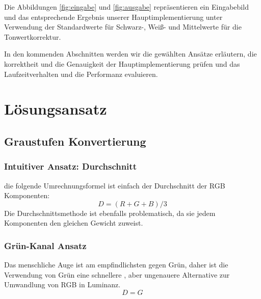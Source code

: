 \documentclass[course=erap]{aspdoc}
\begin{document}
Die Abbildungen \ref{fig:eingabe} und \ref{fig:ausgabe} repräsentieren ein Eingabebild und das entsprechende Ergebnis unserer Hauptimplementierung unter Verwendung der Standardwerte für Schwarz-, Weiß- und Mittelwerte für die Tonwertkorrektur.

In den kommenden Abschnitten werden wir die gewählten Ansätze erläutern, die korrektheit und die Genauigkeit der Hauptimplementierung prüfen und das Laufzeitverhalten und die Performanz evaluieren.


\section{Lösungsansatz}
\subsection{Graustufen Konvertierung}

\subsubsection{Intuitiver Ansatz: Durchschnitt}
die folgende Umrechnungsformel ist einfach der Durchschnitt der RGB Komponenten:
 \[ D = (R + G + B) / 3  \]
Die Durchschnittsmethode ist ebenfalls problematisch, da sie jedem Komponenten den gleichen Gewicht zuweist.

\subsubsection{Grün-Kanal Ansatz}
Das menschliche Auge ist am empfindlichsten gegen Grün, daher ist die Verwendung von Grün eine schnellere , aber ungenauere  Alternative zur Umwandlung von RGB in Luminanz.
\[D = G\] 
\end{document}
